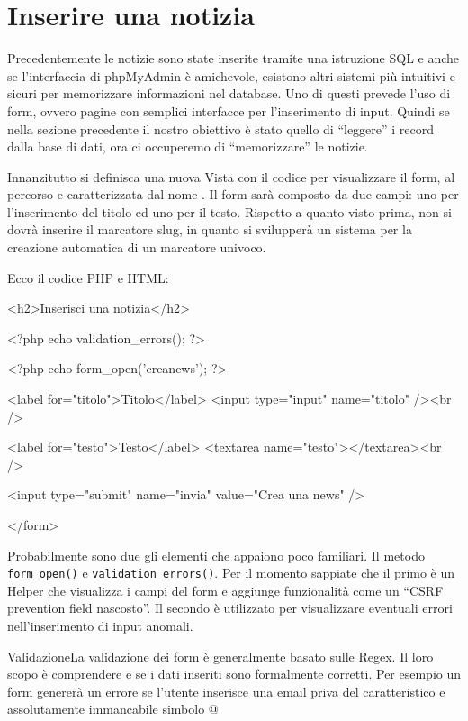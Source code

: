 \section*{Inserire una notizia}
Precedentemente le notizie sono state inserite tramite una istruzione SQL e anche se l'interfaccia di phpMyAdmin è amichevole, esistono altri sistemi più intuitivi e sicuri per memorizzare informazioni nel database. Uno di questi prevede l'uso di form, ovvero pagine con semplici interfacce per l'inserimento di input. Quindi se nella sezione precedente il nostro obiettivo è stato quello di ``leggere'' i record dalla base di dati, ora ci occuperemo di ``memorizzare'' le notizie.

Innanzitutto si definisca una nuova Vista con il codice per visualizzare il form, al percorso  e caratterizzata dal nome . Il form sarà composto da due campi: uno per l'inserimento del titolo ed uno per il testo. Rispetto a quanto visto prima, non si dovrà inserire il marcatore slug, in quanto si svilupperà un sistema per la creazione automatica di un marcatore univoco.

Ecco il codice \ac{PHP} e \ac{HTML}:

\begin{code}
<h2>Inserisci una notizia</h2>

<?php echo validation_errors(); ?>

<?php echo form_open('creanews'); ?>

	<label for="titolo">Titolo</label>
	<input type="input" name="titolo" /><br />

	<label for="testo">Testo</label>
	<textarea name="testo"></textarea><br />

	<input type="submit" name="invia" value="Crea una news" />

</form>
\end{code}

Probabilmente sono due gli elementi che appaiono poco familiari. Il metodo \verb|form_open()| e \verb|validation_errors()|. Per il momento sappiate che il primo è un Helper che visualizza i campi del form e aggiunge funzionalità come un ``CSRF prevention field nascosto''. Il secondo è utilizzato per visualizzare eventuali errori nell'inserimento di input anomali.

\begin{deftab}{Validazione}{La validazione dei form è generalmente basato sulle Regex. Il loro scopo è comprendere e se i dati inseriti sono formalmente corretti. Per esempio un form genererà un errore se l'utente inserisce una email priva del caratteristico e assolutamente immancabile simbolo @}
\end{deftab}

